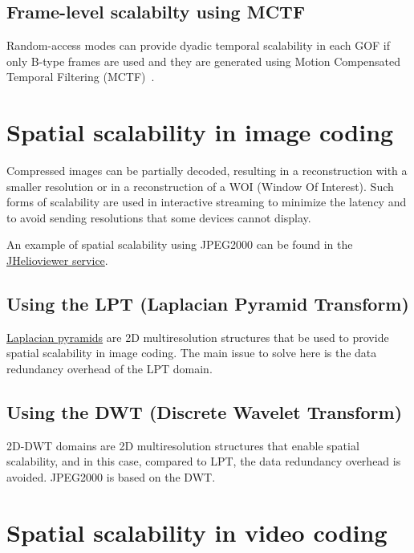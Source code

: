 \subsection{Frame-level scalabilty using MCTF}

Random-access modes can provide dyadic temporal scalability in each
GOF if only B-type frames are used and they are generated using Motion
Compensated Temporal Filtering (MCTF)~\cite{vruiz__MCTF}.


\section{Spatial scalability in image coding}


Compressed images can be partially decoded, resulting in a
reconstruction with a smaller resolution or in a reconstruction of a
WOI (Window Of Interest). Such forms of scalability are used in
interactive streaming to minimize the latency and to avoid sending
resolutions that some devices cannot display.

An example of spatial scalability using JPEG2000 can be found in the
\href{https://www.jhelioviewer.org/}{JHelioviewer service}.

\subsection{Using the LPT (Laplacian Pyramid Transform)}

\href{https://en.wikipedia.org/wiki/Pyramid_(image_processing)#Laplacian_pyramid}{Laplacian
  pyramids} are 2D multiresolution structures that be used to provide
spatial scalability in image coding. The main issue to solve here is
the data redundancy overhead of the LPT domain.

\subsection{Using the DWT (Discrete Wavelet Transform)}

2D-DWT domains are 2D multiresolution structures that enable spatial
scalability, and in this case, compared to LPT, the data redundancy
overhead is avoided. JPEG2000 is based on the DWT.


\section{Spatial scalability in video coding}

